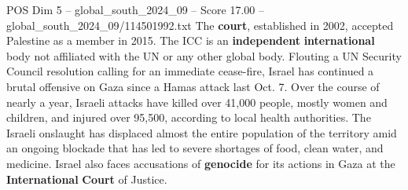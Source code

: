 \begin{textsample}{POS Dim 5 – global\_south\_2024\_09 – Score 17.00 – global\_south\_2024\_09/114501992.txt}
The \textbf{court}, established in 2002, accepted Palestine as a member in 2015.
The ICC is an \textbf{independent} \textbf{international} body not affiliated with the UN or any other global body.
Flouting a UN Security Council resolution calling for an immediate cease-fire, Israel has continued a brutal offensive on Gaza since a Hamas attack last Oct. 7.
Over the course of nearly a year, Israeli attacks have killed over 41,000 people, mostly women and children, and injured over 95,500, according to local health authorities.
The Israeli onslaught has displaced almost the entire population of the territory amid an ongoing blockade that has led to severe shortages of food, clean water, and medicine.
Israel also faces accusations of \textbf{genocide} for its actions in Gaza at the \textbf{International} \textbf{Court} of Justice.

\end{textsample}
